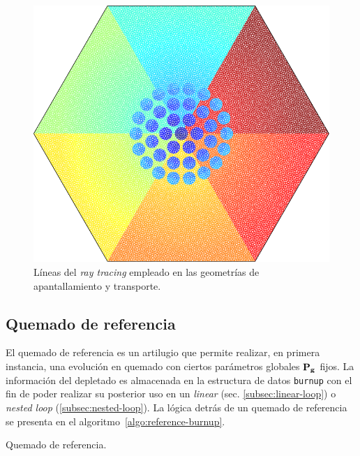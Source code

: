 \documentclass[11pt]{article}
\renewcommand{\vec}[1]{\ensuremath\mathbf{#1}}
\begin{document}
\begin{figure}[!h]
 \begin{center}
  \includegraphics[width=0.4\linewidth]{imagenes/tracks.pdf}
 \end{center}
\caption{\label{fig:tracks} Líneas del \emph{ray tracing} empleado en las geometrías de apantallamiento y transporte.}
\end{figure}


\subsection{Quemado de referencia}

El quemado de referencia es un artilugio que permite realizar, en primera instancia, una evolución en quemado con ciertos parámetros globales $\vec{P_g}$ fijos. La información del depletado es almacenada en la estructura de datos \texttt{burnup} con el fin de poder realizar su posterior uso en un \emph{linear} (sec. \ref{subsec:linear-loop}) o \emph{nested loop} (\ref{subsec:nested-loop}). La lógica detrás de un quemado de referencia se presenta en el algoritmo~\ref{algo:reference-burnup}. 

\medskip
\begin{algorithm}[H]
 
 
 \caption{Quemado de referencia.\label{algo:reference-burnup}}
\end{algorithm}
\medskip
\end{document}
